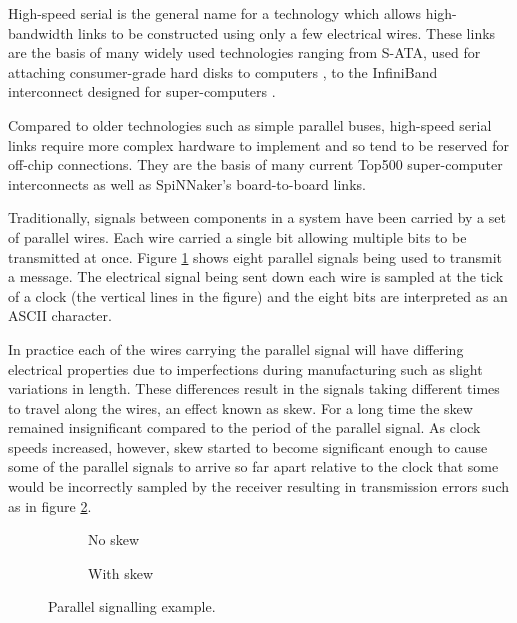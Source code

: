 		\label{sec:high-speed-serial}
		
		High-speed serial is the general name for a technology which allows
		high-bandwidth links to be constructed using only a few electrical wires.
		These links are the basis of many widely used technologies ranging from
		S-ATA, used for attaching consumer-grade hard disks to computers
		\cite{sataio}, to the InfiniBand interconnect designed for super-computers
		\cite{infinibandta}.
		
		Compared to older technologies such as simple parallel buses, high-speed
		serial links require more complex hardware to implement and so tend to be
		reserved for off-chip connections. They are the basis of many current Top500
		super-computer interconnects as well as SpiNNaker's board-to-board links.
		
		Traditionally, signals between components in a system have been carried by a
		set of parallel wires. Each wire carried a single bit allowing multiple bits
		to be transmitted at once. Figure \ref{fig:parallel-example-no-skew} shows
		eight parallel signals being used to transmit a message. The electrical
		signal being sent down each wire is sampled at the tick of a clock (the
		vertical lines in the figure) and the eight bits are interpreted as an ASCII
		character.
		
		In practice each of the wires carrying the parallel signal will have
		differing electrical properties due to imperfections during manufacturing
		such as slight variations in length. These differences result in the
		signals taking different times to travel along the wires, an effect known
		as skew. For a long time the skew remained insignificant compared to the
		period of the parallel signal.  As clock speeds increased, however, skew
		started to become significant enough to cause some of the parallel signals
		to arrive so far apart relative to the clock that some would be
		incorrectly sampled by the receiver resulting in transmission errors such
		as in figure \ref{fig:parallel-example-skew}.
		
		\begin{figure}
			\begin{subfigure}[b]{0.49\textwidth}
				\center
				
				\caption{No skew}
				\label{fig:parallel-example-no-skew}
			\end{subfigure}
			\begin{subfigure}[b]{0.49\textwidth}
				\center
				
				\caption{With skew}
				\label{fig:parallel-example-skew}
			\end{subfigure}
			
			\caption{Parallel signalling example.}
			\label{fig:parallel-example}
		\end{figure}
		
